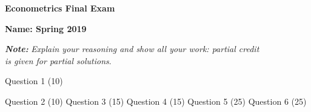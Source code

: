 \documentclass[a4paper,12pt]{article}
\begin{document}
\thispagestyle{plain}
\hspace*{5.45em} \textbf{ \textrm{\LARGE Econometrics Final Exam}} \\ \vspace{-0.5em} 

\textbf{\large \textrm{Name}: \hfill Spring 2019} \\ 


    \vspace{-1.8em}

    \begin{tcolorbox}[colback=gray!16,left=0.5em,bottom=-0.6em,top=0.5em,arc=0mm,float]
\textbf{\textsl{\large Note:}} \textsl{\large Explain your reasoning and show all your work:
partial credit \\ \hspace*{2.8em} is  given  for partial solutions}. \\ 
\end{tcolorbox}
 



\vspace{-0.5em}

\textsf{\Large Question 1 (10)}
\newpage
\mbox{}

\newpage
\vspace*{-1em}
\textsf{\Large Question 2 (10) }
\newpage
\mbox{}
\newpage
\vspace*{-1em}
\textsf{\Large Question 3 (15)}
\newpage
\mbox{}
\newpage
\vspace*{-1em}
\textsf{\Large Question 4 (15) }
\newpage
\mbox{}
\newpage
\vspace*{-1em}
\textsf{\Large Question 5 (25) }
\newpage
\mbox{}
\newpage
\vspace*{-1em}
\textsf{\Large Question 6 (25)}
\newpage
\mbox{}
\end{document}
